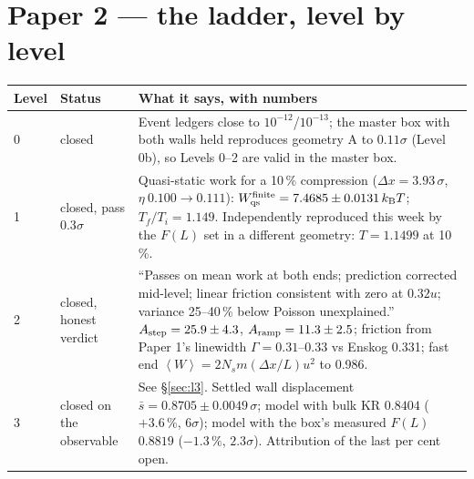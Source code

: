\documentclass[11pt,a4paper]{article}
\newcommand{\kT}{k_{\mathrm B}T}
\newcommand{\avg}[1]{\left\langle #1 \right\rangle}
\begin{document}
\section{Paper 2 --- the ladder, level by level}
\begin{center}\footnotesize
\begin{tabular}{@{}lp{3.4cm}p{9.2cm}@{}}
\toprule
Level & Status & What it says, with numbers \\
\midrule
0 & closed & Event ledgers close to $10^{-12}$/$10^{-13}$; the master box with both walls held reproduces geometry A to $0.11\sigma$ (Level 0b), so Levels 0--2 are valid in the master box. \\
1 & closed, pass $0.3\sigma$ & Quasi-static work for a 10\,\% compression ($\Delta x = 3.93\,\sigma$, $\eta\ 0.100 \to 0.111$): $W_{\rm qs}^{\rm finite} = 7.4685 \pm 0.0131\,\kT$; $T_f/T_i = 1.149$. Independently reproduced this week by the $F(L)$ set in a different geometry: $T = 1.1499$ at 10\,\%. \\
2 & closed, honest verdict & ``Passes on mean work at both ends; prediction corrected mid-level; linear friction consistent with zero at $0.32u$; variance 25--40\,\% below Poisson unexplained.'' $A_{\rm step} = 25.9 \pm 4.3$, $A_{\rm ramp} = 11.3 \pm 2.5$; friction from Paper 1's linewidth $\Gamma = 0.31$--$0.33$ vs Enskog 0.331; fast end $\avg W = 2N_s m(\Delta x/L)u^2$ to 0.986. \\
3 & closed on the observable & See \S\ref{sec:l3}. Settled wall displacement $\bar s = 0.8705 \pm 0.0049\,\sigma$; model with bulk KR $0.8404$ ($+3.6\,\%$, $6\sigma$); model with the box's measured $F(L)$ $0.8819$ ($-1.3\,\%$, $2.3\sigma$). Attribution of the last per cent open. \\

\end{tabular}
\end{center}
\end{document}
